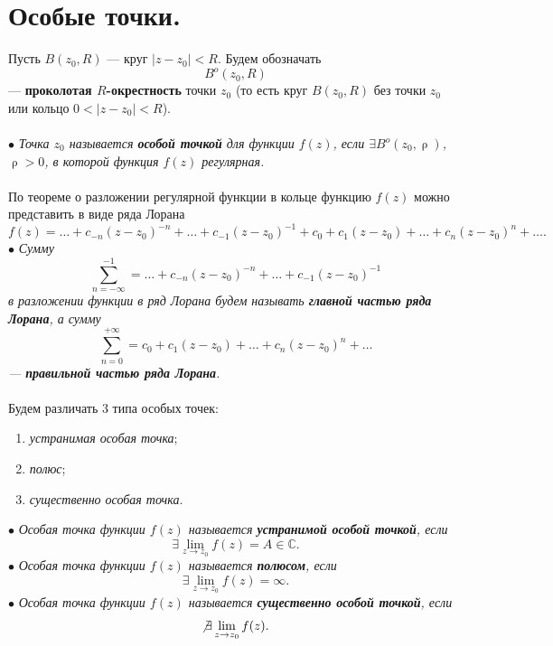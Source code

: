 \documentclass[a4paper, 12pt]{article}
\newcommand{\Cm}{\mathbb{C}}
\renewcommand{\rho}{\uprho}
\begin{document}
\section{Особые точки.}
Пусть $B(z_0, R)$ --- круг $|z-z_0| < R$. Будем обозначать $$B^o(z_0, R)$$ --- \textbf{проколотая $R$-окрестность} точки $z_0$ (то есть круг $B(z_0, R)$ без точки $z_0$ или кольцо $0< |z-z_0|<R$).\\\\
$\bullet$ \textit{Точка $z_0$ называется \textbf{особой точкой} для функции $f(z)$, если $\exists B^o(z_0, \rho)$, $\rho > 0$, в которой функция $f(z)$ регулярная.}\\\\
По теореме о разложении регулярной функции в кольце функцию $f(z)$ можно представить в виде ряда Лорана $$f(z) = \ldots + c_{-n}(z-z_0)^{-n} + \ldots + c_{-1}(z-z_0)^{-1} + c_0 + c_1(z-z_0) + \ldots + c_n(z-z_0)^n + \ldots.$$
$\bullet$ \textit{Сумму $$\sum\limits_{n=-\infty}^{-1} = \ldots + c_{-n}(z-z_0)^{-n} + \ldots + c_{-1}(z-z_0)^{-1}$$ в разложении функции в ряд Лорана будем называть \textbf{главной частью ряда Лорана}, а сумму $$\sum\limits_{n=0}^{+\infty} = c_0 + c_1(z-z_0) + \ldots + c_n(z-z_0)^n + \ldots$$ --- \textbf{правильной частью ряда Лорана}.}\\\\
Будем различать 3 типа особых точек:\begin{enumerate}
	\item \textit{устранимая особая точка};
	\item \textit{полюс};
	\item \textit{существенно особая точка}.
\end{enumerate}
$\bullet$ \textit{Особая точка функции $f(z)$ называется \textbf{устранимой особой точкой}, если} $$\exists \lim\limits_{z\to z_0} f(z) = A\in \Cm.$$
$\bullet$ \textit{Особая точка функции $f(z)$ называется \textbf{полюсом}, если} $$\exists \lim\limits_{z\to z_0} f(z) = \infty.$$
$\bullet$ \textit{Особая точка функции $f(z)$ называется \textbf{существенно особой точкой}, если} $$\not\exists \lim\limits_{z\to z_0} f(z).$$
\end{document}
